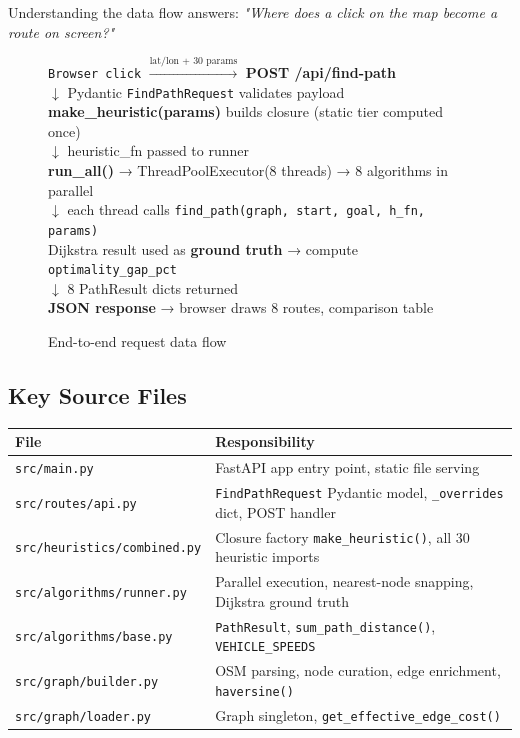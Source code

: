 \documentclass[11pt,a4paper]{article}
\begin{document}
Understanding the data flow answers: \textit{"Where does a click on the map become a route on screen?"}

\begin{figure}[H]
\centering
\begin{mdframed}
\small
\texttt{Browser click} $\xrightarrow{\text{lat/lon + 30 params}}$
\textbf{POST /api/find-path}\\[2pt]
$\downarrow$ Pydantic \texttt{FindPathRequest} validates payload\\[2pt]
\textbf{make\_heuristic(params)} builds closure (static tier computed once)\\[2pt]
$\downarrow$ heuristic\_fn passed to runner\\[2pt]
\textbf{run\_all()} → ThreadPoolExecutor(8 threads) → 8 algorithms in parallel\\[2pt]
$\downarrow$ each thread calls \texttt{find\_path(graph, start, goal, h\_fn, params)}\\[2pt]
Dijkstra result used as \textbf{ground truth} → compute \texttt{optimality\_gap\_pct}\\[2pt]
$\downarrow$ 8 PathResult dicts returned\\[2pt]
\textbf{JSON response} → browser draws 8 routes, comparison table
\end{mdframed}
\caption{End-to-end request data flow}
\end{figure}

\subsection{Key Source Files}
\begin{table}[H]
\centering\small
\begin{tabular}{ll}
\toprule
\textbf{File} & \textbf{Responsibility} \\
\midrule
\texttt{src/main.py} & FastAPI app entry point, static file serving \\
\texttt{src/routes/api.py} & \texttt{FindPathRequest} Pydantic model, \texttt{\_overrides} dict, POST handler \\
\texttt{src/heuristics/combined.py} & Closure factory \texttt{make\_heuristic()}, all 30 heuristic imports \\
\texttt{src/algorithms/runner.py} & Parallel execution, nearest-node snapping, Dijkstra ground truth \\
\texttt{src/algorithms/base.py} & \texttt{PathResult}, \texttt{sum\_path\_distance()}, \texttt{VEHICLE\_SPEEDS} \\
\texttt{src/graph/builder.py} & OSM parsing, node curation, edge enrichment, \texttt{haversine()} \\
\texttt{src/graph/loader.py} & Graph singleton, \texttt{get\_effective\_edge\_cost()} \\
\bottomrule
\end{tabular}
\end{table}
\end{document}

